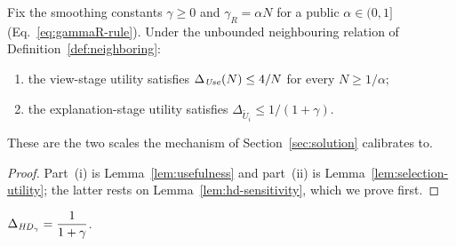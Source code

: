 \begin{proposition}
\label{prop:stage-sensitivity}
Fix the smoothing constants $\gamma\ge0$ and $\gamma_R=\alpha N$ for a public $\alpha\in(0,1]$ (Eq.~\eqref{eq:gammaR-rule}). Under the unbounded neighbouring relation of Definition~\ref{def:neighboring}:
\begin{enumerate}[label=(\roman*),leftmargin=*]
\item the view-stage utility satisfies $\Delta_{\mathit{Use}}(N)\le 4/N$ for every $N\ge1/\alpha$;
\item the explanation-stage utility satisfies $\Delta_{\widetilde U_i}\le 1/(1+\gamma)$.
\end{enumerate}
These are the two scales the mechanism of Section~\ref{sec:solution} calibrates to.
\end{proposition}

\begin{proof}
Part~(i) is Lemma~\ref{lem:usefulness} and part~(ii) is Lemma~\ref{lem:selection-utility}; the latter rests on Lemma~\ref{lem:hd-sensitivity}, which we prove first.
\end{proof}

\begin{lemma}
\label{lem:hd-sensitivity}
$\Delta_{\mathit{HD}_\gamma}=\dfrac{1}{1+\gamma}$.
\end{lemma}

